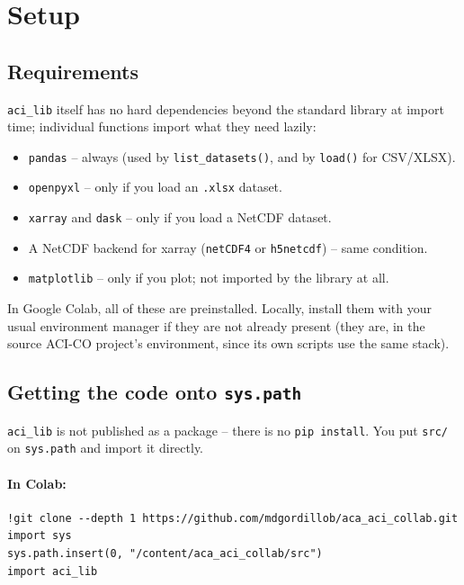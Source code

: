 \documentclass[11pt]{article}
\begin{document}
\section{Setup}

\subsection{Requirements}

\texttt{aci\_lib} itself has no hard dependencies beyond the standard
library at import time; individual functions import what they need lazily:

\begin{itemize}[leftmargin=*]
\item \texttt{pandas} -- always (used by \texttt{list\_datasets()}, and by \texttt{load()} for CSV/XLSX).
\item \texttt{openpyxl} -- only if you load an \texttt{.xlsx} dataset.
\item \texttt{xarray} and \texttt{dask} -- only if you load a NetCDF dataset.
\item A NetCDF backend for xarray (\texttt{netCDF4} or \texttt{h5netcdf}) -- same condition.
\item \texttt{matplotlib} -- only if you plot; not imported by the library at all.
\end{itemize}

In Google Colab, all of these are preinstalled. Locally, install them with
your usual environment manager if they are not already present (they are,
in the source ACI-CO project's environment, since its own scripts use the
same stack).

\subsection{Getting the code onto \texttt{sys.path}}

\texttt{aci\_lib} is not published as a package -- there is no
\texttt{pip install}. You put \texttt{src/} on \texttt{sys.path} and import
it directly.

\paragraph{In Colab:}
\begin{lstlisting}
!git clone --depth 1 https://github.com/mdgordillob/aca_aci_collab.git
import sys
sys.path.insert(0, "/content/aca_aci_collab/src")
import aci_lib
\end{lstlisting}
\end{document}
